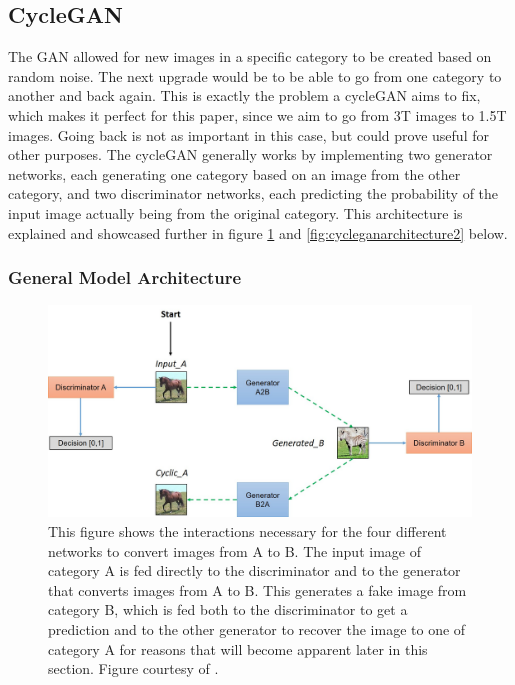 \documentclass[12pt, fleqn, titlepage]{article}
\begin{document}
\subsection{CycleGAN}\label{cyclegan}
The GAN allowed for new images in a specific category to be created based on random noise. The next upgrade would be to be able to go from one category to another and back again. This is exactly the problem a cycleGAN aims to fix, which makes it perfect for this paper, since we aim to go from 3T images to 1.5T images. Going back is not as important in this case, but could prove useful for other purposes. The cycleGAN generally works by implementing two generator networks, each generating one category based on an image from the other category, and two discriminator networks, each predicting the probability of the input image actually being from the original category. This architecture is explained and showcased further in figure \ref{fig:cycleganarchitecture} and \ref{fig:cycleganarchitecture2} below.

\subsubsection{General Model Architecture}
\begin{figure}[H]
	\centering
	\includegraphics[width=0.7\linewidth]{imgs/cyclegan_architecture}
	\caption{This figure shows the interactions necessary for the four different networks to convert images from A to B. The input image of category A is fed directly to the discriminator and to the generator that converts images from A to B. This generates a fake image from category B, which is fed both to the discriminator to get a prediction and to the other generator to recover the image to one of category A for reasons that will become apparent later in this section. Figure courtesy of \cite{model_architecture}.}
	\label{fig:cycleganarchitecture}
\end{figure}
\end{document}
